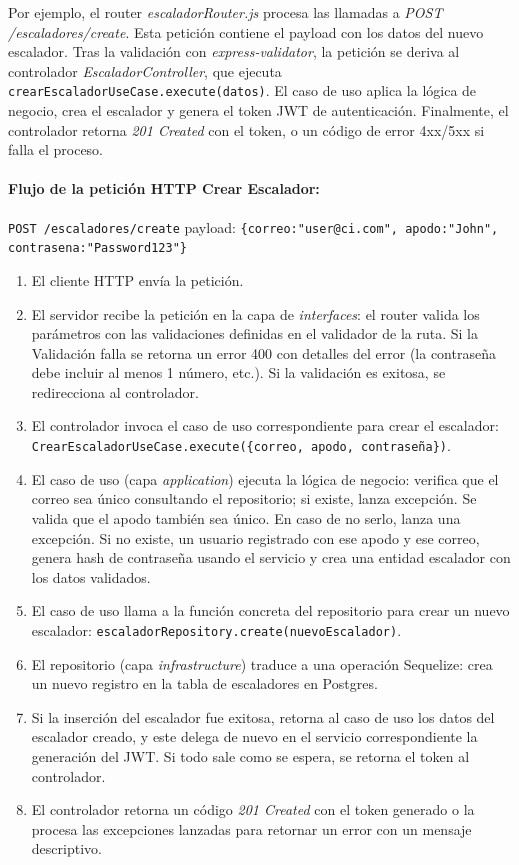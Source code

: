 Por ejemplo, el router \textit{escaladorRouter.js} procesa las llamadas a \textit{POST /escaladores/create}. Esta petición 
contiene el payload con los datos del nuevo escalador. Tras la validación con \textit{express-validator}, la petición se
deriva al controlador \textit{EscaladorController}, que ejecuta \texttt{crearEscaladorUseCase.execute(datos)}. El caso de
uso aplica la lógica de negocio, crea el escalador y genera el token JWT de autenticación. Finalmente, el controlador
retorna \textit{201 Created} con el token, o un código de error 4xx/5xx si falla el proceso.

\paragraph{\textbf{Flujo de la petición HTTP Crear Escalador:}}

\texttt{POST /escaladores/create} payload:
\verb|{correo:"user@ci.com", apodo:"John", contrasena:"Password123"}|

\begin{enumerate}
  \item El cliente HTTP envía la petición.
  \item El servidor recibe la petición en la capa de \textit{interfaces}: el router valida los parámetros con las validaciones  definidas en el validador de la ruta. Si la Validación falla se retorna un error 400 con detalles del error (la contraseña debe incluir al menos 1 número, etc.). Si la validación es exitosa, se redirecciona al controlador.
  \item El controlador invoca el caso de uso correspondiente para crear el escalador: \texttt{CrearEscaladorUseCase.execute(\{correo, apodo, contraseña\})}.
  \item El caso de uso (capa \textit{application}) ejecuta la lógica de negocio: verifica que el correo sea único consultando el repositorio; si existe, lanza excepción. Se valida que el apodo también sea único. En caso de no serlo,  lanza una excepción. Si no existe, un usuario registrado con ese apodo y ese correo, genera hash de contraseña usando el servicio y crea una entidad escalador con los datos validados.
  \item El caso de uso llama a la función concreta del repositorio para crear un nuevo escalador: \texttt{escaladorRepository.create(nuevoEscalador)}.
  \item El repositorio (capa \textit{infrastructure}) traduce a una operación Sequelize: crea un nuevo registro en la   tabla de escaladores en Postgres.
  \item Si la inserción del escalador fue exitosa, retorna al caso de uso los datos del escalador creado, y este delega de nuevo en el servicio correspondiente la generación del JWT. Si todo sale como se espera, se retorna el token al controlador.
  \item El controlador retorna un código \textit{201 Created} con el token generado o la procesa las excepciones lanzadas para retornar un error con un mensaje descriptivo.
\end{enumerate}

